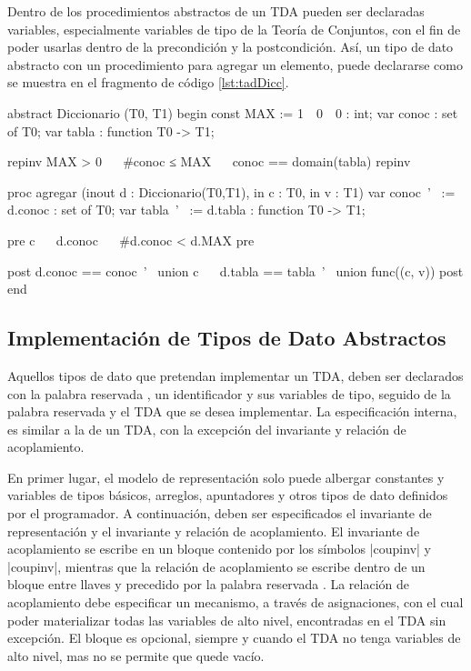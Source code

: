 Dentro de los procedimientos abstractos de un TDA pueden ser declaradas
variables, especialmente variables de tipo de la Teoría de Conjuntos, con el
fin de poder usarlas dentro de la precondición y la postcondición. Así, un tipo
de dato abstracto  con un procedimiento para agregar un
elemento, puede declararse como se muestra en el fragmento de código
\ref{lst:tadDicc}.

\begin{widegracielacode}[caption=TDA Diccionario, label=lst:tadDicc]
abstract Diccionario (T0, T1) begin
  const MAX := 1~~0~~0 : int;
  var   conoc      : set of T0;
  var   tabla      : function T0 -> T1;

  {repinv MAX > 0 ~\Land~ #conoc ≤ MAX ~\Land~ conoc == domain(tabla) repinv}

  proc agregar (inout d : Diccionario(T0,T1), in c : T0, in v : T1)
    var conoc~'~ := d.conoc : set of T0;
    var tabla~'~ := d.tabla : function T0 -> T1;

    {pre c ~\Notelem~ d.conoc ~\Land~ #d.conoc < d.MAX pre}

    {post  d.conoc == conoc~'~ union {c}
         ~\Land~ d.tabla == tabla~'~ union func({(c, v)}) post}
end
\end{widegracielacode}

\subsection{Implementación de Tipos de Dato Abstractos}

Aquellos tipos de dato que pretendan implementar un TDA, deben ser declarados
con la palabra reservada , un identificador y sus variables de
tipo, seguido de la palabra reservada  y el TDA que se
desea implementar. La especificación interna, es similar a la de un TDA, con la
excepción del invariante y relación de acoplamiento.

En primer lugar, el modelo de representación solo puede albergar constantes y
variables de tipos básicos, arreglos, apuntadores y otros tipos de dato
definidos por el programador. A continuación, deben ser especificados el
invariante de representación y el invariante y relación de acoplamiento. El
invariante de acoplamiento se escribe en un bloque contenido por los símbolos
\ingra|{coupinv| y \ingra|coupinv}|, mientras que la relación de
acoplamiento se escribe dentro de un bloque entre llaves y precedido por la
palabra reservada . La relación de acoplamiento debe especificar
un mecanismo, a través de asignaciones, con el cual poder materializar todas
las variables de alto nivel, encontradas en el TDA sin excepción. El bloque
 es opcional, siempre y cuando el TDA no tenga variables de alto
nivel, mas no se permite que quede vacío.

